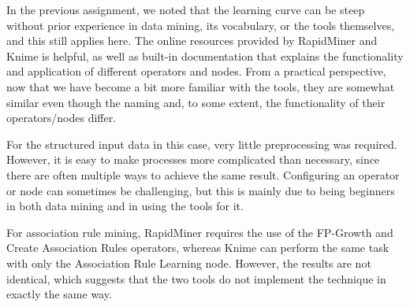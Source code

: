 \label{chap:tool-insights}

In the previous assignment, we noted that the learning curve can be steep without prior experience
in data mining, its vocabulary, or the tools themselves, and this still applies here. The  online
resources provided by RapidMiner and Knime is helpful, as well as built-in documentation that
explains the functionality and application of different operators and nodes. From a practical
perspective, now that we have become a bit more familiar with the tools, they are somewhat similar
even though the naming and, to some extent, the functionality of their operators/nodes differ.

For the structured input data in this case, very little preprocessing was required. However, it is
easy to make processes more complicated than necessary, since there are often multiple ways to
achieve the same result. Configuring an operator or node can sometimes be challenging, but this is
mainly due to being beginners in both data mining and in using the tools for it.

For association rule mining, RapidMiner requires the use of the FP-Growth and Create Association Rules
operators, whereas Knime can perform the same task with only the Association Rule Learning node. However,
the results are not identical, which suggests that the two tools do not implement the technique in exactly
the same way.